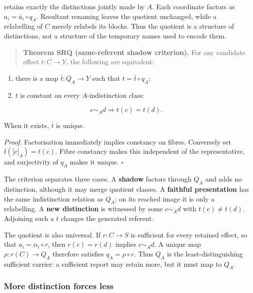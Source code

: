 \documentclass[11pt,a4paper]{article}
\begin{document}
retains exactly the distinctions jointly made by \(A\). Each coordinate
factors as \(a_{i} = {\bar{a}}_{i} \circ q_{A}\). Resultant renaming
leaves the quotient unchanged, while a relabelling of \(C\) merely
relabels its blocks. Thus the quotient is a structure of distinctions,
not a structure of the temporary names used to encode them.

\begin{quote}
\textbf{Theorem SRQ (same-referent shadow criterion).} For any candidate
effect \(t:C \rightarrow Y\), the following are equivalent:
\end{quote}

\begin{enumerate}
\def\labelenumi{\arabic{enumi}.}
\item
  there is a map \(\bar{t}:Q_{A} \rightarrow Y\) such that
  \(t = \bar{t} \circ q_{A}\);
\item
  \(t\) is constant on every \(A\)-indistinction class:
\end{enumerate}

\[c \sim_{A}d \Rightarrow t(c) = t(d).\]

When it exists, \(\bar{t}\) is unique.

\emph{Proof.} Factorisation immediately implies constancy on fibres.
Conversely set \(\bar{t}\left( \lbrack c\rbrack_{A} \right) = t(c)\).
Fibre constancy makes this independent of the representative, and
surjectivity of \(q_{A}\) makes it unique. \(\ensuremath{\square}\)

The criterion separates three cases. A \textbf{shadow} factors through
\(Q_{A}\) and adds no distinction, although it may merge quotient
classes. A \textbf{faithful presentation} has the same indistinction
relation as \(Q_{A}\); on its reached image it is only a relabelling. A
\textbf{new distinction} is witnessed by some \(c \sim_{A}d\) with
\(t(c) \neq t(d)\). Adjoining such a \(t\) changes the generated
referent.

The quotient is also universal. If \(r:C \rightarrow S\) is sufficient
for every retained effect, so that \(a_{i} = \alpha_{i} \circ r\), then
\(r(c) = r(d)\) implies \(c \sim_{A}d\). A unique map
\(\rho:r(C) \rightarrow Q_{A}\) therefore satisfies
\(q_{A} = \rho \circ r\). Thus \(Q_{A}\) is the least-distinguishing
sufficient carrier: a sufficient report may retain more, but it must map
to \(Q_{A}\).

\subsubsection{More distinction forces
less}
\end{document}
